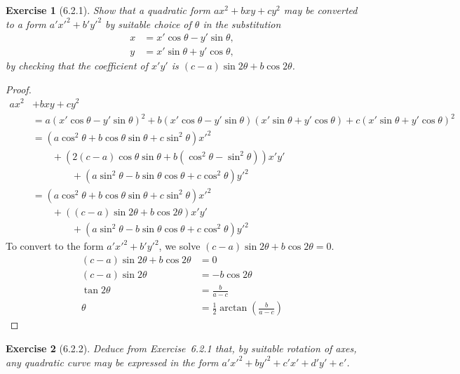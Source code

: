\documentclass[12pt]{article}
\theoremstyle{plain}
\newtheorem{ex}{Exercise}
\begin{document}
\begin{ex} [6.2.1]
  Show that a \emph{quadratic form} $ax^2+bxy+cy^2$ may be converted to a form $a'x'^2+b'y'^2$ by suitable choice of $\theta$ in the substitution
  \begin{align*}
    x &= x'\cos\theta-y'\sin\theta, \\
    y &= x'\sin\theta+y'\cos\theta,
  \end{align*}
  by checking that the coefficient of $x'y'$ is $(c-a)\sin2\theta+b\cos2\theta$.
\end{ex}

\begin{proof}
  \begin{align*}
    ax^2 &+ bxy+cy^2 \\
      &= a(x'\cos\theta-y'\sin\theta)^2+b(x'\cos\theta-y'\sin\theta)(x'\sin\theta+y'\cos\theta)+c(x'\sin\theta+y'\cos\theta)^2 \\
      &= (a\cos^2\theta+b\cos\theta\sin\theta+c\sin^2\theta)x'^2 \\
      & \qquad + (2(c-a)\cos\theta\sin\theta+b(\cos^2\theta-\sin^2\theta))x'y' \\
      & \qquad\qquad + (a\sin^2\theta-b\sin\theta\cos\theta+c\cos^2\theta)y'^2 \\
      &= (a\cos^2\theta+b\cos\theta\sin\theta+c\sin^2\theta)x'^2 \\
      & \qquad + ((c-a)\sin2\theta+b\cos2\theta)x'y' \\
      & \qquad\qquad + (a\sin^2\theta-b\sin\theta\cos\theta+c\cos^2\theta)y'^2
    \end{align*}
  To convert to the form $a'x'^2+b'y'^2$, we solve $(c-a)\sin2\theta+b\cos2\theta=0$.
  \begin{align*}
    (c-a)\sin2\theta+b\cos2\theta &= 0 \\
    (c-a)\sin2\theta &= -b\cos2\theta \\
    \tan2\theta &= \frac{b}{a-c} \\
    \theta &= \frac{1}{2}\arctan\left(\frac{b}{a-c}\right)
  \end{align*}
\end{proof}

\begin{ex} [6.2.2]
  Deduce from Exercise~6.2.1 that, by suitable rotation of axes, any quadratic curve may be expressed in the form $a'x'^2+by'^2+c'x'+d'y'+e'$.
\end{ex}
\end{document}
